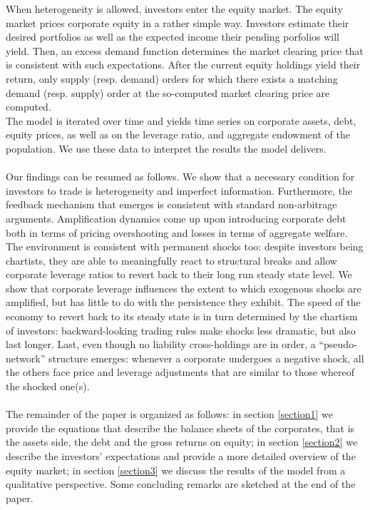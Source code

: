 \documentclass[11pt]{article}
\begin{document}
When heterogeneity is allowed, investors enter the equity market. The equity market prices corporate equity in a rather simple way. Investors estimate their desired portfolios as well as the expected income their pending porfolios will yield. Then, an excess demand function determines the market clearing price that is consistent with such expectations. After the current equity holdings yield their return, only supply (resp. demand) orders for which there exists a matching demand (resp. supply) order at the so-computed market clearing price are computed.\\
The model is iterated over time and yields time series on corporate assets, debt, equity prices, as well as on the leverage ratio, and aggregate endowment of the population. We use these data to interpret the results the model delivers.\\\\
Our findings can be resumed as follows. We show that a necessary condition for investors to trade is heterogeneity and imperfect information. Furthermore, the feedback mechanism that emerges is consistent with standard non-arbitrage arguments. Amplification dynamics come up upon introducing corporate debt both in terms of pricing overshooting and losses in terms of aggregate welfare. The environment is consistent with permanent shocks too: despite investors being chartists, they are able to meaningfully react to structural breaks and allow corporate leverage ratios to revert back to their long run steady state level. We show that corporate leverage influences the extent to which exogenous shocks are amplified, but has little to do with the persistence they exhibit. The speed of the economy to revert back to its steady state is in turn determined by the chartism of investors: backward-looking trading rules make shocks less dramatic, but also last longer. Last, even though no liability cross-holdings are in order, a ``pseudo-network'' structure emerges: whenever a corporate undergoes a negative shock, all the others face price and leverage adjustments that are similar to those whereof the shocked one(s).\\\\
The remainder of the paper is organized as follows: in section \ref{section1} we provide the equations that describe the balance sheets of the corporates, that is the assets side, the debt and the gross returns on equity; in section \ref{section2} we describe the investors' expectations and provide a more detailed overview of the equity market; in section \ref{section3} we discuss the results of the model from a qualitative perspective. Some concluding remarks are sketched at the end of the paper.
%
%
\end{document}
